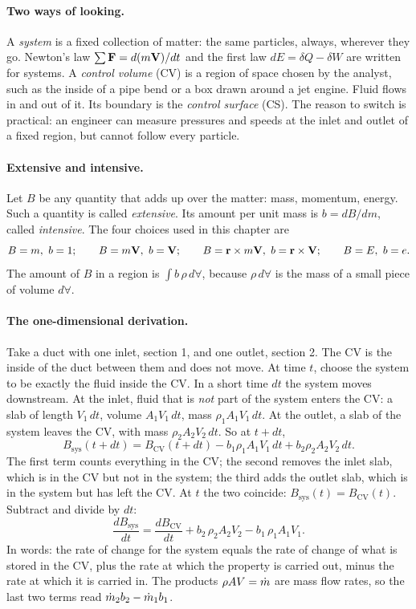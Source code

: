 \paragraph{Two ways of looking.} A \emph{system} is a fixed collection of matter: the same particles, always, wherever they go. Newton's law $\sum \mathbf{F} = d(m\mathbf{V})/dt$ and the first law $dE = \delta Q - \delta W$ are written for systems. A \emph{control volume} (CV) is a region of space chosen by the analyst, such as the inside of a pipe bend or a box drawn around a jet engine. Fluid flows in and out of it. Its boundary is the \emph{control surface} (CS). The reason to switch is practical: an engineer can measure pressures and speeds at the inlet and outlet of a fixed region, but cannot follow every particle.

\paragraph{Extensive and intensive.} Let $B$ be any quantity that adds up over the matter: mass, momentum, energy. Such a quantity is called \emph{extensive}. Its amount per unit mass is $b = dB/dm$, called \emph{intensive}. The four choices used in this chapter are
\[
B = m,\ b = 1; \qquad B = m\mathbf{V},\ b = \mathbf{V}; \qquad B = \mathbf{r}\times m\mathbf{V},\ b = \mathbf{r}\times\mathbf{V}; \qquad B = E,\ b = e .
\]
The amount of $B$ in a region is $\int b\,\rho\, d\forall$, because $\rho\,d\forall$ is the mass of a small piece of volume $d\forall$.

\paragraph{The one-dimensional derivation.} Take a duct with one inlet, section 1, and one outlet, section 2. The CV is the inside of the duct between them and does not move. At time $t$, choose the system to be exactly the fluid inside the CV. In a short time $dt$ the system moves downstream. At the inlet, fluid that is \emph{not} part of the system enters the CV: a slab of length $V_1\,dt$, volume $A_1V_1\,dt$, mass $\rho_1A_1V_1\,dt$. At the outlet, a slab of the system leaves the CV, with mass $\rho_2A_2V_2\,dt$. So at $t + dt$,
\[
B_\text{sys}(t + dt) = B_\text{CV}(t + dt) - b_1\rho_1A_1V_1\,dt + b_2\rho_2A_2V_2\,dt .
\]
The first term counts everything in the CV; the second removes the inlet slab, which is in the CV but not in the system; the third adds the outlet slab, which is in the system but has left the CV. At $t$ the two coincide: $B_\text{sys}(t) = B_\text{CV}(t)$. Subtract and divide by $dt$:
\[
\frac{dB_\text{sys}}{dt} = \frac{dB_\text{CV}}{dt} + b_2\,\rho_2A_2V_2 - b_1\,\rho_1A_1V_1 .
\]
In words: the rate of change for the system equals the rate of change of what is stored in the CV, plus the rate at which the property is carried out, minus the rate at which it is carried in. The products $\rho AV = \dot m$ are mass flow rates, so the last two terms read $\dot m_2b_2 - \dot m_1b_1$.

